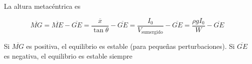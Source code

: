 La altura metac\'entrica es

\begin{equation}
	\overline{MG} = \overline{ME}-\overline{GE}= \frac{\overline{x}}{\tan \theta} - \overline{GE} 
= \frac{I_0}{V_{\textrm{sumergido}}} - \overline{GE} = \frac{\rho g I_0}{W} - \overline{GE}
\end{equation}

Si $\overline{MG}$ es positiva, el equilibrio es estable (para peque\~nas perturbaciones). Si 
$\overline{GE}$ es negativa, el equilibrio es estable siempre